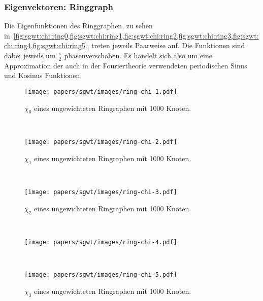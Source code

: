 \subsubsection{Eigenvektoren: Ringgraph}
Die Eigenfunktionen des Ringgraphen, zu sehen 
in~\cref{fig:sgwt:chi:ring0,fig:sgwt:chi:ring1,fig:sgwt:chi:ring2,fig:sgwt:chi:ring3,fig:sgwt:chi:ring4,fig:sgwt:chi:ring5},
treten jeweils Paarweise auf. Die Funktionen sind dabei jeweils um 
$\frac{\pi}{2}$ phasenverschoben. Es handelt sich also um eine 
Approximation der auch in der Fouriertheorie verwendeten periodischen Sinus und 
Kosinus Funktionen.
\begin{figure}
    \centering
    \begin{minipage}[b]{0.49\textwidth}
        \texttt{[image: papers/sgwt/images/ring-chi-1.pdf]}
        \vspace{-45pt}
        \caption{$\chi_0$ eines ungewichteten Ringraphen mit 1000 Knoten.}
        \label{fig:sgwt:chi:ring0}
    \end{minipage}
    ~
    \begin{minipage}[b]{0.49\textwidth}
        \texttt{[image: papers/sgwt/images/ring-chi-2.pdf]}
        \vspace{-45pt}
        \caption{$\chi_1$ eines ungewichteten Ringraphen mit 1000 Knoten.}
        \label{fig:sgwt:chi:ring1}
    \end{minipage}
    ~
    \begin{minipage}[b]{0.49\textwidth}
        \texttt{[image: papers/sgwt/images/ring-chi-3.pdf]}
        \vspace{-45pt}
        \caption{$\chi_2$ eines ungewichteten Ringraphen mit 1000 Knoten.}
        \label{fig:sgwt:chi:ring2}
    \end{minipage}
    ~
    \begin{minipage}[b]{0.49\textwidth}
        \texttt{[image: papers/sgwt/images/ring-chi-4.pdf]}
        \vspace{-45pt}
        \caption{$\chi_3$ eines ungewichteten Ringraphen mit 1000 Knoten.}
        \label{fig:sgwt:chi:ring3}
    \end{minipage}
    ~
    \begin{minipage}[b]{0.49\textwidth}
        \texttt{[image: papers/sgwt/images/ring-chi-5.pdf]}

\end{minipage}
\end{figure}
